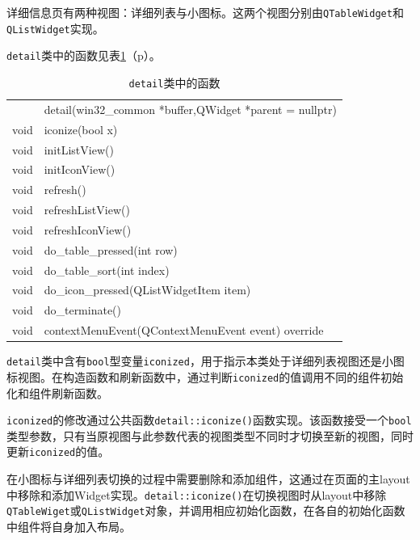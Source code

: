 \documentclass{beamer}
\newcommand\code[1]{\texttt{#1}}
\newcommand\myref[1]{\ref{#1}（p\pageref{#1}）}
\begin{document}
\begin{frame}
    详细信息页有两种视图：详细列表与小图标。这两个视图分别由\code{QTableWidget}和\code{QListWidget}实现。

\code{detail}类中的函数见表\myref{table:detailfunc}。

\begin{table}
    \centering
    \ttfamily
    \begin{tabular}{rl}
        \hline
            & detail(win32\_common *buffer,QWidget *parent = nullptr) \\
        void & iconize(bool x) \\    
        void & initListView() \\
        void & initIconView() \\
        void & refresh() \\
        void & refreshListView() \\
        void & refreshIconView() \\
        void & do\_table\_pressed(int row) \\
        void & do\_table\_sort(int index) \\
        void & do\_icon\_pressed(QListWidgetItem \*item) \\
        void & do\_terminate() \\ 
        void & contextMenuEvent(QContextMenuEvent \*event) override \\
        \hline       
    \end{tabular}
    \caption{\code{detail}类中的函数}
    \label{table:detailfunc}
\end{table}
\end{frame}

\begin{frame}
    \code{detail}类中含有\code{bool}型变量\code{iconized}，用于指示本类处于详细列表视图还是小图标视图。在构造函数和刷新函数中，通过判断\code{iconized}的值调用不同的组件初始化和组件刷新函数。

\code{iconized}的修改通过公共函数\code{detail::iconize()}函数实现。该函数接受一个\code{bool}类型参数，只有当原视图与此参数代表的视图类型不同时才切换至新的视图，同时更新\code{iconized}的值。

在小图标与详细列表切换的过程中需要删除和添加组件，这通过在页面的主layout中移除和添加Widget实现。\code{detail::iconize()}在切换视图时从layout中移除\code{QTableWiget}或\code{QListWidget}对象，并调用相应初始化函数，在各自的初始化函数中组件将自身加入布局。
\end{frame}
\end{document}
